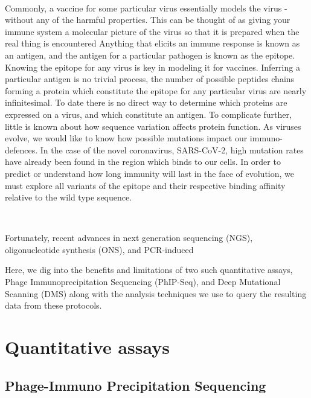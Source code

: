 \documentclass{article}
\begin{document}
~

Commonly, a vaccine for some particular virus essentially models the virus - without any of the harmful properties.
This can be thought of as giving your immune system a molecular picture of the virus so that it is prepared when the real thing is encountered
Anything that elicits an immune response is known as an antigen, and the antigen for a particular pathogen is known as the epitope.
Knowing the epitope for any virus is key in modeling it for vaccines.
Inferring a particular antigen is no trivial process, the number of possible peptides chains forming a protein
which constitute the epitope for any particular virus are nearly infinitesimal.
To date there is no direct way to determine which proteins are expressed on a virus, and which constitute an antigen.
To complicate further, little is known about how sequence variation affects protein function.
As viruses evolve, we would like to know how possible mutations impact our immuno-defences.
In the case of the novel coronavirus, SARS-CoV-2, high mutation rates have already been found in the region which binds to our cells.
In order to predict or understand how long immunity will last in the face of evolution, we must explore all variants of the epitope
and their respective binding affinity relative to the wild type sequence.

~

Fortunately, recent advances in next generation sequencing (NGS), oligonucleotide synthesis (ONS), and PCR-induced 

Here, we dig into the benefits and limitations of two such quantitative assays, Phage Immunoprecipitation Sequencing (PhIP-Seq), 
and Deep Mutational Scanning (DMS) along with the analysis techniques we use to query the resulting data from these protocols.



\cite{Starr2020}


\section*{Quantitative assays}

\subsection*{Phage-Immuno Precipitation Sequencing}
\end{document}

